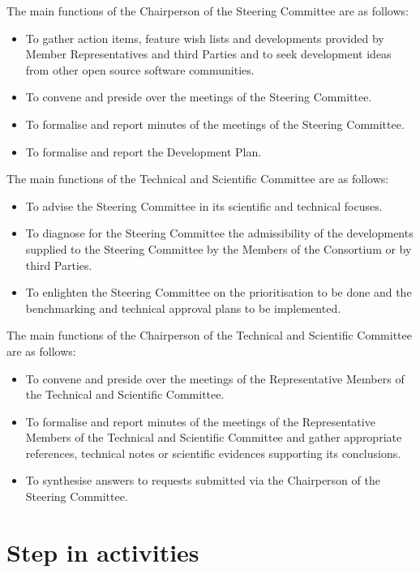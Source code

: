 The main functions of the Chairperson of the Steering Committee are as follows:
\begin{itemize}
\item To gather action items, feature wish lists and developments provided by
  Member Representatives and third Parties and to seek development ideas from
  other open source software communities.
\item To convene and preside over the meetings of the Steering Committee.
\item To formalise and report minutes of the meetings of the Steering
  Committee.
\item To formalise and report the Development Plan.
\end{itemize}

The main functions of the Technical and Scientific Committee are as follows:
\begin{itemize}
\item To advise the Steering Committee in its scientific and technical focuses.
\item To diagnose for the Steering Committee the admissibility of the
  developments supplied to the Steering Committee by the Members of the
  Consortium or by third Parties.
\item To enlighten the Steering Committee on the prioritisation to be done and
  the benchmarking and technical approval plans to be implemented.
\end{itemize}

The main functions of the Chairperson of the Technical and Scientific Committee
are as follows:
\begin{itemize}
\item To convene and preside over the meetings of the Representative Members of
  the Technical and Scientific Committee.
\item To formalise and report minutes of the meetings of the Representative
  Members of the Technical and Scientific Committee and gather appropriate
  references, technical notes or scientific evidences supporting its
  conclusions.
\item To synthesise answers to requests submitted via the Chairperson of the
  Steering Committee.
\end{itemize}

\section{Step in \telemacsystem{} activities}

